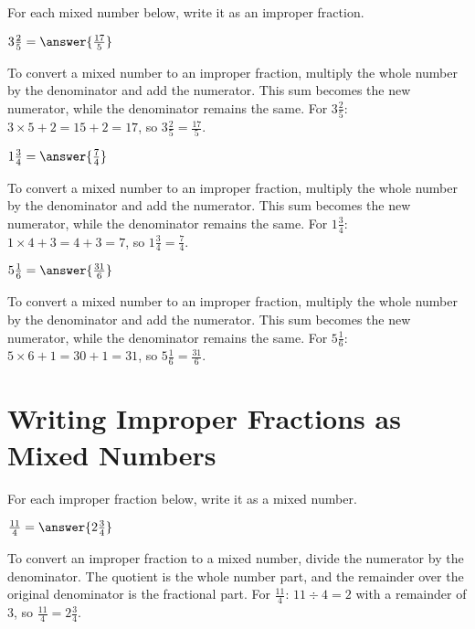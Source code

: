 \documentclass{ximera}
\begin{document}
For each mixed number below, write it as an improper fraction.

\begin{problem}
$3\frac{2}{5} = \answer{\frac{17}{5}}$
\begin{feedback}
To convert a mixed number to an improper fraction, multiply the whole number by the denominator and add the numerator. This sum becomes the new numerator, while the denominator remains the same. For $3\frac{2}{5}$: $3 \times 5 + 2 = 15 + 2 = 17$, so $3\frac{2}{5} = \frac{17}{5}$.
\end{feedback}
\end{problem}

\begin{problem}
$1\frac{3}{4} = \answer{\frac{7}{4}}$
\begin{feedback}
To convert a mixed number to an improper fraction, multiply the whole number by the denominator and add the numerator. This sum becomes the new numerator, while the denominator remains the same. For $1\frac{3}{4}$: $1 \times 4 + 3 = 4 + 3 = 7$, so $1\frac{3}{4} = \frac{7}{4}$.
\end{feedback}
\end{problem}

\begin{problem}
$5\frac{1}{6} = \answer{\frac{31}{6}}$
\begin{feedback}
To convert a mixed number to an improper fraction, multiply the whole number by the denominator and add the numerator. This sum becomes the new numerator, while the denominator remains the same. For $5\frac{1}{6}$: $5 \times 6 + 1 = 30 + 1 = 31$, so $5\frac{1}{6} = \frac{31}{6}$.
\end{feedback}
\end{problem}



\section*{Writing Improper Fractions as Mixed Numbers}

For each improper fraction below, write it as a mixed number.

\begin{problem}
$\frac{11}{4} = \answer{2\frac{3}{4}}$
\begin{feedback}
To convert an improper fraction to a mixed number, divide the numerator by the denominator. The quotient is the whole number part, and the remainder over the original denominator is the fractional part. For $\frac{11}{4}$: $11 \div 4 = 2$ with a remainder of $3$, so $\frac{11}{4} = 2\frac{3}{4}$.
\end{feedback}
\end{problem}
\end{document}
